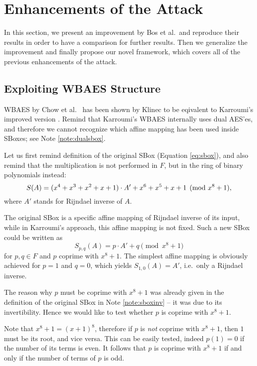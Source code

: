 \section{Enhancements of the Attack}   %
\label{sec:enhancements}

In this section, we present an improvement by Bos et al.\ and reproduce their results in order to have a comparison for further results. Then we generalize the improvement and finally propose our novel framework, which covers all of the previous enhancements of the attack.



\subsection{Exploiting WBAES Structure}

WBAES by Chow et al.\ \cite{chow2002aes} has been shown by Klinec \cite{klinec2013white} to be eqivalent to Karroumi's improved version \cite{karroumi2010protecting}. Remind that Karroumi's WBAES internally uses dual AES'es, and therefore we cannot recognize which affine mapping has been used inside SBoxes; see Note \ref{note:dualsbox}.

Let us first remind definition of the original SBox (Equation \ref{eq:sbox}), and also remind that the multiplication is not performed in $F$, but in the ring of binary polynomials instead:
\[
	S(A) = (x^4 + x^3 + x^2 + x + 1) \cdot A' + x^6 + x^5 + x + 1 \pmod{x^8+1} ,
\]
where $A'$ stands for Rijndael inverse of $A$.

The original SBox is a specific affine mapping of Rijndael inverse of its input, while in Karroumi's approach, this affine mapping is not fixed. Such a new SBox could be written as   %
\begin{equation}
\label{eq:spq}
	S_{p,q}(A) = p\cdot A' + q \pmod{x^8+1}
\end{equation}
for $p,q\in F$ and $p$ coprime with $x^8+1$. The simplest affine mapping is obviously achieved for $p=1$ and $q=0$, which yields $S_{1,0}(A) = A'$, i.e.\ only a Rijndael inverse.

\begin{remark}
\label{rem:coprime}
	The reason why $p$ must be coprime with $x^8+1$ was already given in the definition of the original SBox in Note \ref{note:sboxinv} -- it was due to its invertibility. Hence we would like to test whether $p$ is coprime with $x^8+1$.
	
	Note that $x^8+1 = (x+1)^8$, therefore if $p$ is {\em not} coprime with $x^8+1$, then $1$ must be its root, and vice versa. This can be easily tested, indeed $p(1) = 0$ if the number of its terms is even. It follows that $p$ is coprime with $x^8+1$ if and only if the number of terms of $p$ is odd.
\end{remark}


